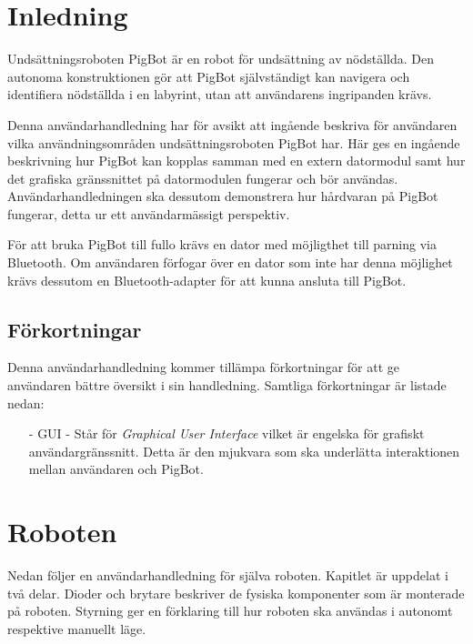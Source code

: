 \documentclass[11pt]{article}
\begin{document}
\pagebreak
{}

\section{Inledning}
Undsättningsroboten PigBot är en robot för undsättning av nödställda. Den autonoma konstruktionen gör att PigBot självständigt kan navigera och identifiera nödställda i en labyrint, utan att användarens ingripanden krävs.

Denna användarhandledning har för avsikt att ingående beskriva för användaren vilka användningsområden undsättningsroboten PigBot har. Här ges en ingående beskrivning hur PigBot kan kopplas samman med en extern datormodul samt hur det grafiska gränssnittet på datormodulen fungerar och bör användas. Användarhandledningen ska dessutom demonstrera hur hårdvaran på PigBot fungerar, detta ur ett användarmässigt perspektiv. 

För att bruka PigBot till fullo krävs en dator med möjligthet till parning via Bluetooth\textsuperscript{\circledR}. Om användaren förfogar över en dator som inte har denna möjlighet krävs dessutom en Bluetooth\textsuperscript{\circledR}-adapter för att kunna ansluta till PigBot.

\subsection{Förkortningar}
Denna användarhandledning kommer tillämpa förkortningar för att ge användaren bättre översikt i sin handledning. Samtliga förkortningar är listade nedan:

\begin{itemize}
  \item[-] GUI - Står för \textit{Graphical User Interface} vilket är engelska för grafiskt användargränssnitt. Detta är den mjukvara som ska underlätta interaktionen mellan användaren och PigBot.
\end{itemize}

\pagebreak

\section{Roboten}
Nedan följer en användarhandledning för själva roboten. Kapitlet är uppdelat i två delar. Dioder och brytare beskriver de fysiska komponenter som är monterade på roboten. Styrning ger en förklaring till hur roboten ska användas i autonomt respektive manuellt läge.
\end{document}
